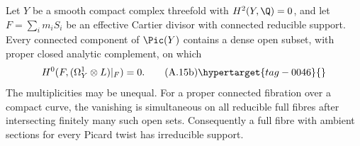 
\begin{proposition}\hypertarget{tag-01AP}{}\label{cdp:st:A.3.5}


Let $Y$ be a smooth compact complex threefold with $H^2(Y,\Q)=0$, and let $F=\sum_i m_iS_i$ be an effective Cartier divisor with connected reducible support. Every connected component of $\Pic(Y)$ contains a dense open subset, with proper closed analytic complement, on which
\[
 H^0(F,(\Omega_Y^1\otimes L)|_F)=0.
 \tag{A.15b}\hypertarget{tag-0046}{}\label{cdp:eq:A.15b}
\]
The multiplicities may be unequal. For a proper connected fibration over a compact curve, the vanishing is simultaneous on all reducible full fibres after intersecting finitely many such open sets. Consequently a full fibre with ambient sections for every Picard twist has irreducible support.
\end{proposition}


